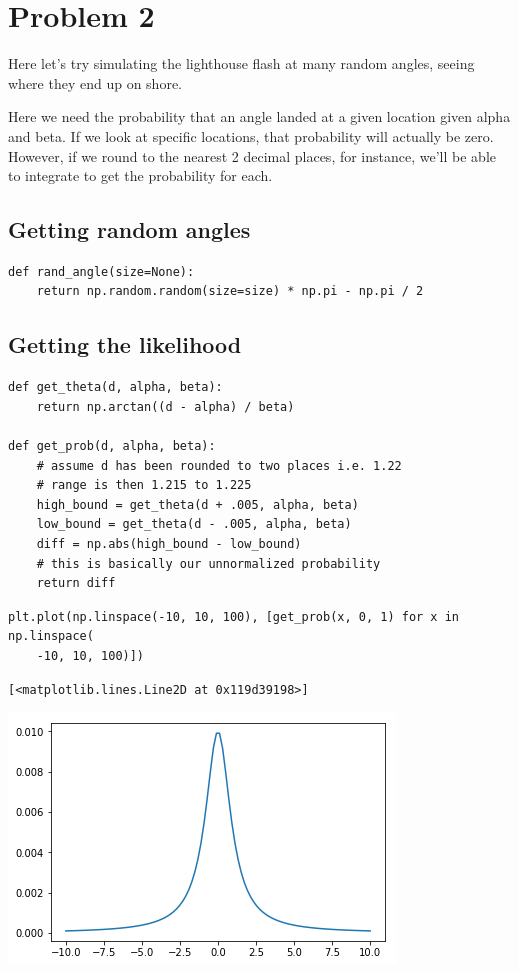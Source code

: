 \documentclass[11pt]{article}
\begin{document}
\section*{Problem 2}
\label{sec-2}
Here let's try simulating the lighthouse flash at many random angles, seeing
where they end up on shore. 

Here we need the probability that an angle landed at a given location given
alpha and beta. If we look at specific locations, that probability will
actually be zero. However, if we round to the nearest 2 decimal places, for
instance, we'll be able to integrate to get the probability for each.

\subsection*{Getting random angles}
\label{sec-2-1}

\begin{verbatim}
def rand_angle(size=None):
    return np.random.random(size=size) * np.pi - np.pi / 2
\end{verbatim}

\subsection*{Getting the likelihood}
\label{sec-2-2}

\begin{verbatim}
def get_theta(d, alpha, beta):
    return np.arctan((d - alpha) / beta)

def get_prob(d, alpha, beta):
    # assume d has been rounded to two places i.e. 1.22
    # range is then 1.215 to 1.225
    high_bound = get_theta(d + .005, alpha, beta)
    low_bound = get_theta(d - .005, alpha, beta)
    diff = np.abs(high_bound - low_bound)
    # this is basically our unnormalized probability
    return diff
\end{verbatim}


\begin{verbatim}
plt.plot(np.linspace(-10, 10, 100), [get_prob(x, 0, 1) for x in np.linspace(
    -10, 10, 100)])
\end{verbatim}

\begin{verbatim}
[<matplotlib.lines.Line2D at 0x119d39198>]
\end{verbatim}
\includegraphics[width=.9\linewidth]{./obipy-resources/322RmS.png}
\end{document}
